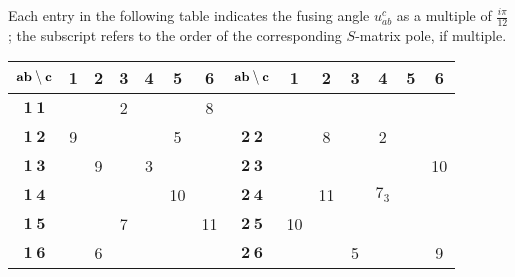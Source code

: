 \documentclass[a4paper,12pt]{report}
\begin{document}
\newpage

Each entry in the following table indicates the fusing angle $u_{ab}^{c}$ as a multiple of $\frac{i\pi}{12}$; the
subscript refers to the order of the corresponding $S$-matrix pole, if multiple.

\vspace{0.5cm}

\begin{flushleft}

\begin{tabular}{|c|c|c|c|c|c|c||c|c|c|c|c|c|c|}\hline
$\small \textbf{ab} \setminus \textbf{c}$  & \textbf{1} & \textbf{2} & \textbf{3} & \textbf{4} & \textbf{5} & \textbf{6} &  $\small \textbf{ab} \setminus \textbf{c}$  & \textbf{1} & \textbf{2} & \textbf{3} & \textbf{4} & \textbf{5} & \textbf{6}  \\
\hline

$\textbf{1}\:\textbf{1}$ & \hspace{6mm} & \hspace{6mm} & 2& \hspace{6mm} & \hspace{6mm} & 8 &  & \hspace{6mm} &
\hspace{6mm} & \hspace{6mm} & \hspace{6mm} & \hspace{6mm} & \hspace{6mm} \\ \hline

$\textbf{1}\:\textbf{2}$ & 9  &  & \hspace{6mm} & &5 & \hspace{6mm} & $\textbf{2}\:\textbf{2}$ &  & 8 & &2 & &
\\ \hline

$\textbf{1}\:\textbf{3}$&  & 9 & & 3 & &  & $\textbf{2}\:\textbf{3}$ &  &  & & & &10 \\ \hline

$\textbf{1}\:\textbf{4}$ &  &  & &  &10 &  & $\textbf{2}\:\textbf{4}$ &  & 11 & & $7_{3}$& & \\ \hline

$\textbf{1}\:\textbf{5}$ &  &  &7 &  & & 11 & $\textbf{2}\:\textbf{5}$ & 10 &  & & & & \\ \hline

$\textbf{1}\:\textbf{6}$ &  & 6 & &  & &  & $\textbf{2}\:\textbf{6}$ &  &  & 5& & &9 \\ \hline

\end{tabular}


\end{flushleft}
\end{document}
